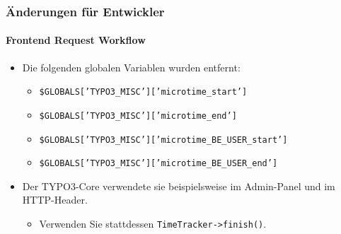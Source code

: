 \begin{frame}[fragile]
	\frametitle{Änderungen für Entwickler}
	\framesubtitle{Frontend Request Workflow}

	\lstset{basicstyle=\smaller\ttfamily}

	\begin{itemize}
		\item Die folgenden globalen Variablen wurden entfernt:

			\begin{itemize}
				\item \texttt{\$GLOBALS['TYPO3\_MISC']['microtime\_start']}
				\item \texttt{\$GLOBALS['TYPO3\_MISC']['microtime\_end']}
				\item \texttt{\$GLOBALS['TYPO3\_MISC']['microtime\_BE\_USER\_start']}
				\item \texttt{\$GLOBALS['TYPO3\_MISC']['microtime\_BE\_USER\_end']}
			\end{itemize}

		\item Der TYPO3-Core verwendete sie beispielsweise im Admin-Panel und im HTTP-Header.

			\begin{itemize}\smaller
				\item[\ding{228}] Verwenden Sie stattdessen \texttt{TimeTracker->finish()}.
			\end{itemize}\normalsize

	\end{itemize}

\end{frame}



